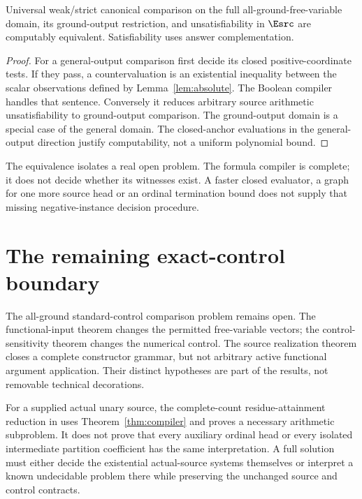\documentclass[11pt,a4paper]{article}
\begin{document}
\begin{theorem}\label{thm:decision-equivalence}
Universal weak/strict canonical comparison on the full all-ground-free-variable
domain, its ground-output restriction, and unsatisfiability in $\Esrc$ are
computably equivalent.  Satisfiability uses answer complementation.
\end{theorem}
\begin{proof}
For a general-output comparison first decide its closed positive-coordinate
tests.  If they pass, a countervaluation is an existential inequality between
the scalar observations defined by Lemma~\ref{lem:absolute}.  The Boolean
compiler handles that sentence.  Conversely it reduces arbitrary source
arithmetic unsatisfiability to ground-output comparison.  The ground-output
domain is a special case of the general domain.  The closed-anchor evaluations
in the general-output direction justify computability, not a uniform
polynomial bound.
\end{proof}

The equivalence isolates a real open problem.  The formula compiler is complete;
it does not decide whether its witnesses exist.  A faster closed evaluator,
a graph for one more source head or an ordinal termination bound does not
supply that missing negative-instance decision procedure.




\section{The remaining exact-control boundary}

The all-ground standard-control comparison problem remains open.  The
functional-input theorem changes the permitted free-variable vectors; the
control-sensitivity theorem changes the numerical control.  The source
realization theorem closes a complete constructor grammar, but not arbitrary
active functional argument application.  Their distinct hypotheses are
part of the results, not removable technical decorations.

For a supplied actual unary source, the complete-count residue-attainment
reduction in \cite{wwfoundations} uses Theorem~\ref{thm:compiler} and proves
a necessary arithmetic subproblem.  It does not prove that every auxiliary
ordinal head or every isolated intermediate partition coefficient has the
same interpretation.  A full solution must either decide the existential
actual-source systems themselves or interpret a known undecidable problem
there while preserving the unchanged source and control contracts.


\end{document}
